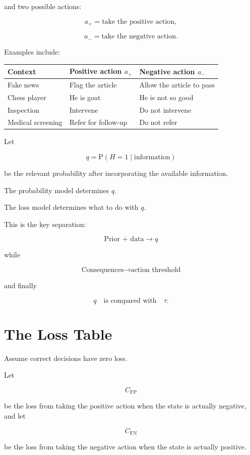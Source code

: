 \documentclass[11pt]{article}
\newcommand{\CFP}{C_{\mathrm{FP}}}
\newcommand{\CFN}{C_{\mathrm{FN}}}
\newcommand{\Prob}{\mathrm{P}}
\begin{document}
and two possible actions:

\[
a_+
=
\text{take the positive action},
\]

\[
a_-
=
\text{take the negative action}.
\]

Examples include:

\begin{center}
\begin{tabular}{lll}
\toprule
Context & Positive action $a_+$ & Negative action $a_-$ \\
\midrule
Fake news & Flag the article & Allow the article to pass \\
Chess player & He is goat & He is not so good \\
Inspection & Intervene & Do not intervene \\
Medical screening & Refer for follow-up & Do not refer \\
\bottomrule
\end{tabular}
\end{center}

Let

\[
q=\Prob(H=1\mid\text{information})
\]

be the relevant probability after incorporating the available information.

The probability model determines $q$.

The loss model determines what to do with $q$.

This is the key separation:

\[
\boxed{
\text{Prior + data}
\longrightarrow
q
}
\]

while

\[
\boxed{
\text{Consequences}
\longrightarrow
\text{action threshold}
}
\]

and finally

\[
\boxed{
q
\quad\text{is compared with}\quad
\tau.
}
\]

\section{The Loss Table}

Assume correct decisions have zero loss.

Let

\[
\CFP
\]

be the loss from taking the positive action when the state is actually negative, and let

\[
\CFN
\]

be the loss from taking the negative action when the state is actually positive.
\end{document}
